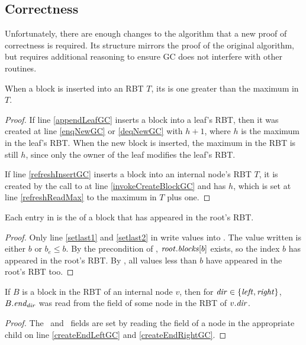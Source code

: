 
\subsection{Correctness}
Unfortunately, there are enough changes to the algorithm that a new proof of correctness
is required.  Its structure mirrors the proof of the original algorithm, but requires additional
reasoning to ensure GC does not interfere with other routines.

\begin{observation}\label{RBTinsertions}
When a block is inserted into an RBT $T$, its  is one greater than the maximum  in $T$.
\end{observation}
\begin{proof}
If line \ref{appendLeafGC} inserts a block into a leaf's RBT, then it was created at 
line \ref{enqNewGC} or \ref{deqNewGC} with  $h+1$, where $h$ is the maximum 
in the leaf's RBT.  When the new block is inserted, the maximum  in the RBT is still $h$,
since only the owner of the leaf modifies the leaf's RBT.

If line \ref{refreshInsertGC} inserts a block  into an internal node's RBT $T$,
it is created by the call to  at line \ref{invokeCreateBlockGC} and 
has  $h$, which is set at line \ref{refreshReadMax} to  the maximum  in $T$ plus one.
\end{proof}

\begin{observation}\label{lastinroot}
Each entry in  is the  of a block that has appeared in the root's RBT.
\end{observation}
\begin{proof}
Only line \ref{setlast1} and \ref{setlast2} in  write values into .
The value written is either $b$ or $b_e \leq b$.
By the precondition of , $\mbox{\textnormal{\textit{root}}}.\mbox{\textit{blocks}}[b]$ exists, so the index $b$ has appeared
in the root's RBT.
By , all values less than $b$ have appeared in the root's RBT too.
\end{proof}

\begin{observation}
\label{edirGC} 
If $B$ is a block in the RBT of an internal node $v$, then for $\mbox{\textnormal{\textit{dir}}} \in \{\mbox{\textit{left}},\mbox{\textit{right}}\}$,
$B.\mbox{\textit{end\textsubscript{dir}}}$ was read from the  field of some node in the RBT of $v.\mbox{\textnormal{\textit{dir}}}$.
\end{observation}
\begin{proof}
The \eleft\ and \eright\ fields are set by reading the  field of a node in the appropriate child
on line \ref{createEndLeftGC} and \ref{createEndRightGC}.
\end{proof}


